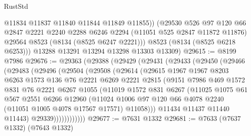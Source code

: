 \begin{lexlean}{RustStd}
\begin{coremodule}
            @11834
            @11837
            @11840
            @11844
            @11849
            @11855))
        (@29530
          @526
          @97
          @120
          @66
          @2847
          @2221
          @2240
          @2288
          @6246
          @2294
          (@11051 @525 @2847 @11872 @11876)
          @29564
          @8523
          (@8134 (@8525 @6247 @2221)))
        @8523
        (@8134 (@8525 @6218 @6253)))
      @13288
      @13291
      @13294
      @13298
      @13303
      @13309)
@29615 := @8199 @7986
@29676 := @29363
    (@29388
      (@29429
        (@29431
          (@29433
            (@29450
              (@29466
                (@29483
                  (@29496
                    (@29504
                      (@29508
                        (@29614
                          (@29615
                            @1967
                            @1967
                            @8203
                            @6263
                            @1573
                            @136
                            @76
                            @2221
                            @6269
                            @2221
                            @2815
                            (@9151
                              @7986
                              @469
                              @1572
                              @831
                              @76
                              @2221
                              @6267
                              @1055
                              (@11019
                                @1572
                                @831
                                @6267
                                (@11025
                                  @1075
                                  @61
                                  @567
                                  @2551
                                  @6266
                                  @12960
                                  (@11024
                                    @1006
                                    @97
                                    @120
                                    @66
                                    @4078
                                    @2240
                                    (@11051 @1005 @4078 @17567 @17571)
                                    @11058)))
                              @11434
                              @11437
                              @11440
                              @11443)
                            @29339))))))))))))
@29677 := @7631 @1332
@29681 := @7633 (@7637 @1332) (@7643 @1332)

\end{coremodule}
\end{lexlean}
